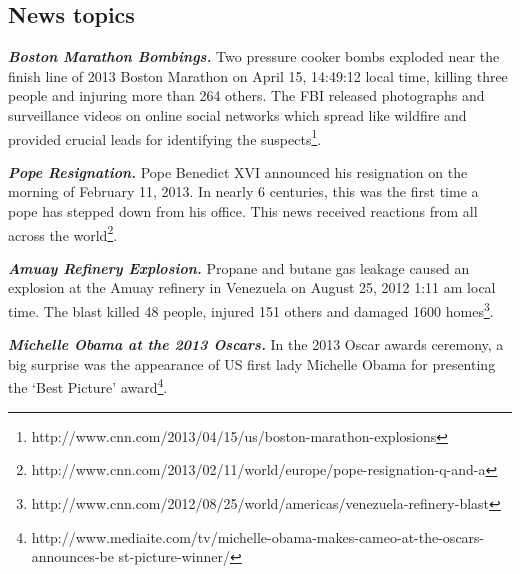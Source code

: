 
\subsection{News topics}

\noindent
\textbf{\emph{Boston Marathon Bombings.}}
Two pressure cooker bombs exploded near the finish line of 2013 Boston Marathon on April 15, 14:49:12 local time,
killing three people and injuring more than 264 others.
The FBI released photographs and surveillance videos on online social networks which spread like wildfire and provided crucial leads for identifying the suspects\footnote{http://www.cnn.com/2013/04/15/us/boston-marathon-explosions}.

\noindent
\textbf{\emph{Pope Resignation.}}
Pope Benedict XVI announced his resignation on the morning of February 11, 2013. In nearly 6 centuries,
this was the first time a pope has stepped down from his office. This news
received reactions from all across the world\footnote{http://www.cnn.com/2013/02/11/world/europe/pope-resignation-q-and-a}.

\noindent
\textbf{\emph{Amuay Refinery Explosion.}}
Propane and butane gas leakage caused an explosion at the Amuay refinery in Venezuela on August 25, 2012 1:11 am local time. The blast killed 48 people, injured 151 others and damaged
1600 homes\footnote{http://www.cnn.com/2012/08/25/world/americas/venezuela-refinery-blast}.

\noindent
\textbf{\emph{Michelle Obama at the 2013 Oscars.}}
In the 2013 Oscar awards ceremony, a big surprise was
the appearance of US first lady Michelle Obama for presenting the `Best Picture' award\footnote{http://www.mediaite.com/tv/michelle-obama-makes-cameo-at-the-oscars-announces-be
st-picture-winner/}. %


